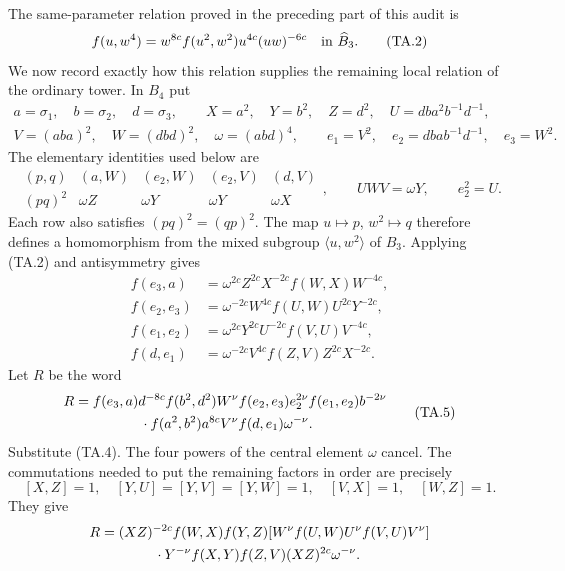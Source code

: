The same-parameter relation proved in the preceding part of this audit is
\[
 f(u,w^4)=w^{8c}f(u^2,w^2)u^{4c}(uw)^{-6c}
                         \quad\hbox{in }\widehat B_3.       \tag{TA.2}
\]
We now record exactly how this relation supplies the remaining local
relation of the ordinary tower.  In $B_4$ put
\[
\begin{gathered}
 a=\sigma_1,\quad b=\sigma_2,\quad d=\sigma_3,\qquad
 X=a^2,\quad Y=b^2,\quad Z=d^2,\quad
 U=dba^2b^{-1}d^{-1},\\
 V=(aba)^2,\quad W=(dbd)^2,\quad\omega=(abd)^4,\qquad
 e_1=V^2,\quad e_2=dbab^{-1}d^{-1},\quad e_3=W^2.
\end{gathered}
\]
The elementary identities used below are
\[
\begin{array}{c|cccc}
(p,q)&(a,W)&(e_2,W)&(e_2,V)&(d,V)\\ \hline
(pq)^2&\omega Z&\omega Y&\omega Y&\omega X
\end{array},\qquad UWV=\omega Y,\qquad e_2^2=U.       \tag{TA.3}
\]
Each row also satisfies $(pq)^2=(qp)^2$.  The map
$u\mapsto p$, $w^2\mapsto q$ therefore defines a homomorphism
from the mixed subgroup $\langle u,w^2\rangle$ of $B_3$.
Applying (TA.2) and antisymmetry gives
\[
\begin{aligned}
 f(e_3,a)&=\omega^{2c}Z^{2c}X^{-2c}f(W,X)W^{-4c},\\
 f(e_2,e_3)&=\omega^{-2c}W^{4c}f(U,W)U^{2c}Y^{-2c},\\
 f(e_1,e_2)&=\omega^{2c}Y^{2c}U^{-2c}f(V,U)V^{-4c},\\
 f(d,e_1)&=\omega^{-2c}V^{4c}f(Z,V)Z^{2c}X^{-2c}.
\end{aligned}                                                   \tag{TA.4}
\]
Let $R$ be the word
\[
\begin{split}
R={}&f(e_3,a)d^{-8c}f(b^2,d^2)W^\nu
       f(e_2,e_3)e_2^{2\nu}f(e_1,e_2)b^{-2\nu}\\
 &\hspace{12mm}\cdot f(a^2,b^2)a^{8c}V^\nu
                    f(d,e_1)\omega^{-\nu}.
\end{split}                                                     \tag{TA.5}
\]
Substitute (TA.4).  The four powers of the central element $\omega$
cancel.  The commutations needed to put the remaining factors in order
are precisely
\[
 [X,Z]=1,\quad [Y,U]=[Y,V]=[Y,W]=1,\quad
 [V,X]=1,\quad[W,Z]=1.
\]
They give
\[
\begin{split}
R={}&(XZ)^{-2c}f(W,X)f(Y,Z)
 [W^\nu f(U,W)U^\nu f(V,U)V^\nu]\\
 &\hspace{9mm}\cdot Y^{-\nu}f(X,Y)f(Z,V)(XZ)^{2c}\omega^{-\nu}.
\end{split}
\]
